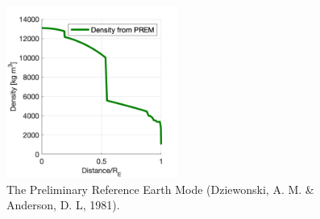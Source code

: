 \begin{figure}
    \label{Fig:PREM}
    \begin{center}
    \includegraphics[width=0.5\textwidth]{Figures/Gravimetry/Gravimetry01_PREM.png}
    \caption{The Preliminary Reference Earth Mode (Dziewonski, A. M. \& Anderson, D. L, 1981).}
    \end{center}
\end{figure}
\ifanswers
